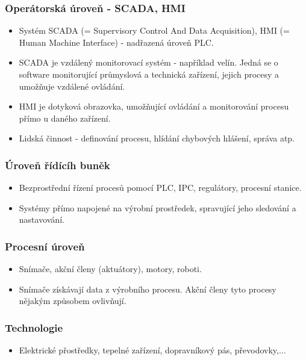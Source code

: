 \subsubsection*{Operátorská úroveň - SCADA, HMI}
\begin{itemize}
    \item Systém SCADA (= Supervisory Control And Data Acquisition), HMI (= Human Machine Interface) - nadřazená úroveň PLC.
    \item SCADA je vzdálený monitorovací systém - například velín. Jedná se o software monitorující průmyslová a technická zařízení, jejich procesy a umožňuje vzdálené ovládání.
    \item HMI je dotyková obrazovka, umožňující ovládání a monitorování procesu přímo u daného zařízení. 
    \item Lidská činnost - definování procesu, hlídání chybových hlášení, správa atp.
\end{itemize}

\subsubsection*{Úroveň řídícíh buněk}
\begin{itemize}
    \item Bezprostřední řízení procesů pomocí PLC, IPC, regulátory, procesní stanice.
    \item Systémy přímo napojené na výrobní prostředek, spravující jeho sledování a nastavování. 
\end{itemize}

\subsubsection*{Procesní úroveň}
\begin{itemize}
    \item Snímače, akční členy (aktuátory), motory, roboti.
    \item Snímače získávají data z výrobního procesu. Akční členy tyto procesy nějakým způsobem ovlivňují. 
\end{itemize}

\subsubsection*{Technologie}
\begin{itemize}
    \item Elektrické přostředky, tepelné zařízení, dopravníkový pás, převodovky,...
\end{itemize}

